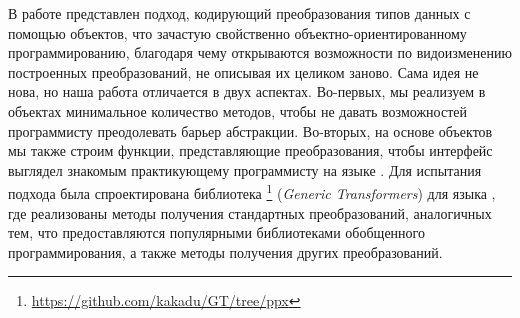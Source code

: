 В работе представлен подход, кодирующий преобразования типов данных с помощью объектов, что зачастую свойственно объектно-ориентированному программированию, благодаря чему открываются возможности по видоизменению построенных преобразований, не описывая их целиком заново. Сама идея не нова, но наша работа отличается в двух аспектах. Во-первых, мы реализуем в объектах минимальное количество методов, чтобы не давать возможностей программисту преодолевать барьер абстракции.
Во-вторых, на основе объектов мы также строим функции, представляющие преобразования, чтобы интерфейс выглядел знакомым практикующему программисту на языке \ocaml{}.
Для испытания подхода была спроектирована библиотека \GT{}\footnote{\url{https://github.com/kakadu/GT/tree/ppx}} (\emph{Generic Transformers}) для языка \ocaml{}, где реализованы методы получения стандартных преобразований, аналогичных тем, что предоставляются популярными библиотеками обобщенного программирования, а также методы получения других преобразований.

